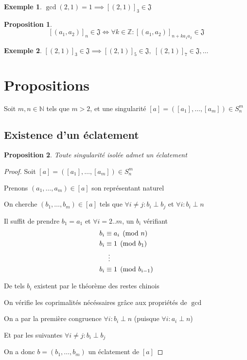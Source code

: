 \documentclass{article}
\newtheorem{proposition}{Proposition}
\newtheorem{example}{Exemple}
\begin{document}
\begin{example}
    $\gcd(2, 1) = 1 \implies {[(2, 1)]}_3 \in \mathfrak{J}$
\end{example}

\begin{proposition}
    \[ 
    {[(a_1, a_2)]}_n \in \mathfrak{J} \iff 
    \forall k \in \mathbb{Z}: {[(a_1, a_2)]}_{n+ka_1a_2} \in \mathfrak{J} 
    \]
\end{proposition}

\begin{example}
    ${[(2, 1)]}_3 \in \mathfrak{J} \implies {[(2, 1)]}_5 \in \mathfrak{J},\; {[(2, 1)]}_7 \in \mathfrak{J}, \dots$
\end{example}

\newpage

\section{Propositions}

Soit $m, n \in \mathbb{N}$ tels que $m > 2$, et une singularité $[a] = ([a_1], \dots, [a_m]) \in S_n^m$

\subsection{Existence d'un éclatement}

\begin{proposition}
    Toute singularité isolée admet un éclatement
\end{proposition}

\begin{proof}
    Soit $[a] = ([a_1], \dots, [a_m]) \in S_n^m$

    Prenons $(a_1, \dots, a_m) \in [a]$ son représentant naturel

    On cherche $(b_1, \dots, b_m) \in [a]$ tels que $\forall i \neq j : b_i \perp b_j$ et $\forall i : b_i \perp n$

    Il suffit de prendre $b_1 = a_1$ et $\forall i = 2..m$, un $b_i$ vérifiant
    \begin{align*}
        b_i & \equiv a_i \pmod n \\
        b_i & \equiv 1 \pmod {b_1} \\
            & \vdotswithin{\equiv} \\
        b_i & \equiv 1 \pmod {b_{i-1}} 
    \end{align*}

    De tels $b_i$ existent par le théorème des restes chinois

    On vérifie les coprimalités nécéssaires grâce aux propriétés de $\gcd$

    On a par la première congruence $\forall i : b_i \perp n$ (puisque $\forall i : a_i \perp n$)

    Et par les suivantes $\forall i \neq j : b_i \perp b_j$

    On a donc $b = (b_1, \dots, b_m)$ un éclatement de $[a]$
\end{proof}
\end{document}
